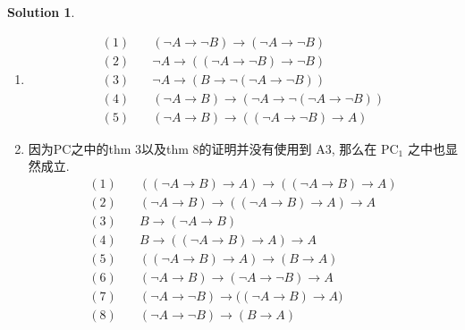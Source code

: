 \documentclass[a4paper, 12pt]{ctexart} %
\theoremstyle{plain}
\theoremstyle{definition}
\newtheorem*{solution}{Solution}
\theoremstyle{remark}
\begin{document}
\begin{solution}
\begin{enumerate}
    \item    \begin{align*}
        (1)\quad & \left(\neg A  \to \neg B \right) \to \left(\neg A  \to \neg B\right) \tag{thm 1} \\
        (2)\quad & \neg A  \to \left( \left( \neg A  \to \neg B     \right) \to \neg B     \right) \tag{rmp, thm 3} \\
        (3)\quad & \neg A  \to \left(B \to \neg  \left(\neg A \to \neg B \right)\right) \tag{rmp, thm 15} \\
        (4)\quad & \left(\neg A  \to B \right) \to \left( \neg A \to \neg \left( \neg A \to \neg  B\right)\right)\tag{rmp, A2}\\
        (5)\quad & \left(\neg A \to B \right) \to \left( \left(\neg A \to \neg B \right) \to  A    \right) \tag{thm 8, A3}
    \end{align*}
    \item 
    因为PC之中的thm 3以及thm 8的证明并没有使用到 A3, 那么在 $\text{PC}_{1}$ 之中也显然成立. 
    \begin{align*}
        (1)\quad& \left(\left(\neg A \to B \right) \to A   \right) \to \left( \left( \neg A \to B \right)  \to A \right) \tag{thm 1} \\
        (2)\quad& \left(\neg A \to B \right) \to \left( \left( \neg  A \to B \right) \to  A    \right) \to A \tag{rmp, thm 3}\\
        (3)\quad& B \to \left( \neg  A\to B \right) \tag{A1} \\
        (4)\quad& B \to \left(\left( \neg A \to B \right) \to A \right) \to  A \tag{(2),(3),thm 8}\\
        (5)\quad& \left(\left(\neg  A \to B \right) \to A \right) \to \left(B \to A \right) \tag{rmp, thm 3} \\
        (6)\quad& \left(\neg A \to B\right) \to \left(\neg A \to \neg B \right) \to A \tag{A3$'$}\\
        (7)\quad& \left(\neg A \to \neg B \right) \to \big(\left(\neg A  \to B \right) \to A \big)\tag{rmp, thm 3}\\
        (8)\quad& \left(\neg A \to \neg B \right) \to \left( B \to  A\right) \tag{(5),(7),thm 8} \\
    \end{align*}
\end{enumerate}
\end{solution}
\end{document}
